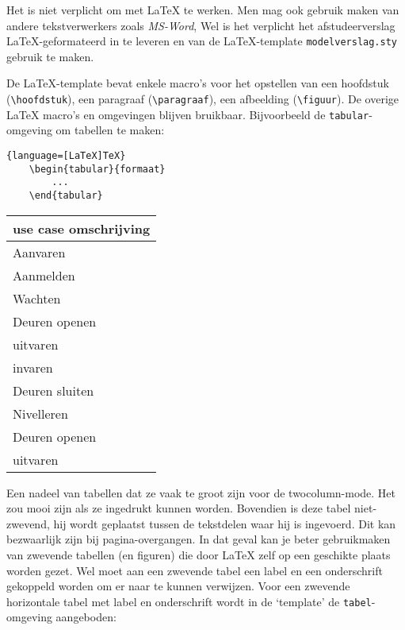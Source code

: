 
Het is niet verplicht om met \LaTeX{} te werken. Men mag ook gebruik
maken van andere tekstverwerkers zoals \emph{MS-Word}, Wel is het
verplicht het afstudeerverslag \LaTeX{}-geformateerd in te leveren en
van de \LaTeX{}-template \verb!modelverslag.sty! gebruik te
maken.

De \LaTeX{}-template bevat enkele macro's voor het opstellen van een
hoofdstuk (\verb!\hoofdstuk!), een paragraaf (\verb!\paragraaf!), een
afbeelding (\verb!\figuur!). De overige \LaTeX{} macro's en omgevingen
blijven bruikbaar. Bijvoorbeeld de \verb!tabular!-omgeving om tabellen
te maken:

\begin{lstlisting}{language=[LaTeX]TeX}
	\begin{tabular}{formaat}
		... 
	\end{tabular}
\end{lstlisting}
 

\begin{center}
	\begin{tabular}{|l||r|}
		\hline
		\multicolumn{2}{|c|}{use case omschrijving}\\
		\hline
		Aanvaren     & \the\paperwidth\\
		Aanmelden      & \the\textwidth\\
		Wachten    & \the\columnwidth\\
		Deuren openen & \the\columnsep\\
		uitvaren  & \the\oddsidemargin\\
		invaren & \the\evensidemargin\\
		Deuren sluiten    & \the\paperheight\\
		Nivelleren     & \the\textheight\\
		Deuren openen & \the\columnsep\\
		uitvaren  & \the\oddsidemargin\\
	 
		\hline
	\end{tabular}
\end{center}

Een nadeel van tabellen dat ze vaak te groot zijn voor de
twocolumn-mode. Het zou mooi zijn als ze ingedrukt kunnen
worden. Bovendien is deze tabel niet-zwevend, hij wordt geplaatst
tussen de tekstdelen waar hij is ingevoerd. Dit kan bezwaarlijk zijn
bij pagina-overgangen. In dat geval kan je beter gebruikmaken van
zwevende tabellen (en figuren) die door \LaTeX{} zelf op een geschikte
plaats worden gezet. Wel moet aan een zwevende tabel een label en een
onderschrift gekoppeld worden om er naar te kunnen verwijzen. Voor een
zwevende horizontale tabel met label en onderschrift wordt in de
`template' de \verb!tabel!-omgeving aangeboden:\\

